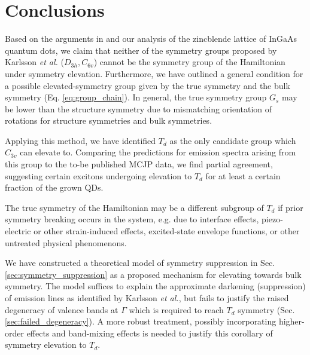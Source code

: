 \section{Conclusions} \label{sec:conclusions}


Based on the arguments in \cite{bulk_limiting} and our analysis of the zincblende lattice of InGaAs quantum dots, we claim that neither of the symmetry groups proposed by Karlsson \textit{et al.} ($D_{3h}, C_{6v}$) cannot be the symmetry group of the Hamiltonian under symmetry elevation. Furthermore, we have outlined a general condition for a possible elevated-symmetry group given by the true symmetry and the bulk symmetry (Eq. \ref{eq:group_chain}). In general, the true symmetry group $G_s$ may be lower than the structure symmetry due to mismatching orientation of rotations for structure symmetries and bulk symmetries.

Applying this method, we have identified $T_d$ as the only candidate group which $C_{3v}$ can elevate to. Comparing the predictions for emission spectra arising from this group to the to-be published MCJP data, we find partial agreement, suggesting certain excitons undergoing elevation to $T_d$ for at least a certain fraction of the grown QDs.

The true symmetry of the Hamiltonian may be a different subgroup of $T_d$ if prior symmetry breaking occurs in the system, e.g. due to interface effects, piezo-electric or other strain-induced effects, excited-state envelope functions, or other untreated physical phenomenons. 

We have constructed a theoretical model of symmetry suppression in Sec. \ref{sec:symmetry_suppression} as a proposed mechanism for elevating towards bulk symmetry. The model suffices to explain the approximate darkening (suppression) of emission lines as identified by Karlsson \textit{et al.}, but fails to justify the raised degeneracy of valence bands at $\Gamma$ which is required to reach $T_d$ symmetry (Sec. \ref{sec:failed_degeneracy}). A more robust treatment, possibly incorporating higher-order effects and band-mixing effects is needed to justify this corollary of symmetry elevation to $T_d$.

